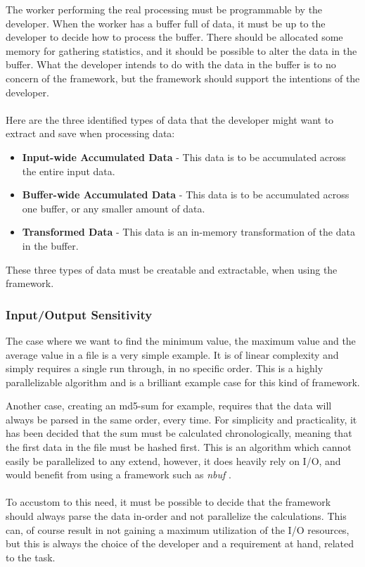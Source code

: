 \documentclass[a4paper]{article}
\newcommand{\nbuf}{\textit{nbuf} }
\begin{document}
The worker performing the real processing must be programmable by the developer. When the worker has a buffer full of data, it must be up to the developer to decide how to process the buffer. There should be allocated some memory for gathering statistics, and it should be possible to alter the data in the buffer. What the developer intends to do with the data in the buffer is to no concern of the framework, but the framework should support the intentions of the developer.\\\\

Here are the three identified types of data that the developer might want to extract and save when processing data:
\begin{itemize}
\item \textbf{Input-wide Accumulated Data} - This data is to be accumulated across the entire input data.
\item \textbf{Buffer-wide Accumulated Data} - This data is to be accumulated across one buffer, or any smaller amount of data.
\item \textbf{Transformed Data} - This data is an in-memory transformation of the data in the buffer.
\end{itemize}

These three types of data must be creatable and extractable, when using the framework.


\subsubsection{Input/Output Sensitivity}
The case where we want to find the minimum value, the maximum value and the average value in a file is a very simple example. It is of linear complexity and simply requires a single run through, in no specific order. This is a highly parallelizable algorithm and is a brilliant example case for this kind of framework. 

Another case, creating an md5-sum for example, requires that the data will always be parsed in the same order, every time. For simplicity and practicality, it has been decided that the sum must be calculated chronologically, meaning that the first data in the file must be hashed first. This is an algorithm which cannot easily be parallelized to any extend, however, it does heavily rely on I/O, and would benefit from using a framework such as \nbuf.\\\\

To accustom to this need, it must be possible to decide that the framework should always parse the data in-order and not parallelize the calculations. This can, of course result in not gaining a maximum utilization of the I/O resources, but this is always the choice of the developer and a requirement at hand, related to the task. 
\end{document}
